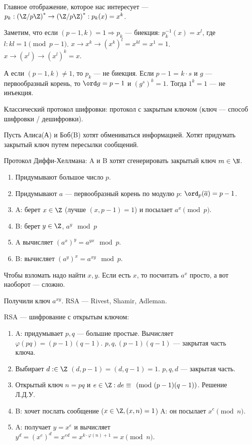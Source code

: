 Главное отображение, которое нас интересует --- $p_k: \left(\Z / p\Z\right)^* \to \left(\Z / p\Z\right)^*: p_k(x) = x^k$.

Заметим, что если  $(p - 1,k)=1 \Rightarrow p_k$ --- биекция:  $p_k^{-1}(x) = x^l$, где  $l: kl = 1 \pmod{p-1}$.  $x\to x^k\to(x^k)^l = x^{kl} = x^1 = 1$. $x\to (x^l) \to (x^l)^k = x$.

А если $(p - 1, k) \neq 1$, то $p_k$ --- не биекция. Если  $p - 1$ =  $k \cdot s$ и  $g$ --- первообразный корень, то  $\ord g = p - 1$ и $(g^s)^k = 1$. Тогда  $1^k=1$ --- не инъекция.

Классический протокол шифровки: протокол с закрытым ключом (ключ --- способ шифровки / дешифровки).

Пусть Алиса(А) и Боб(B) хотят обмениваться информацией. Хотят придумать закрытый ключ путем пересылки сообщений. 

Протокол Диффи-Хеллмана: A и B хотят сгенерировать закрытый ключ $m \in \N$.
 \begin{enumerate}
     \item Придумывают большое число $p$.
     \item Придумывают  $a$ --- первообразный корень по модулю  $p$:  $\ord_p(\overline{a}) = p - 1$.
     \item A: берет  $x \in \Z$ (лучше $(x, p - 1) = 1$) и посылает $a^x \pmod p$.
     \item B: берет $y \in \Z$,  $a^y \mod p$ 
     \item A вычисляет $\left(a^x\right)^y = a^{yx} \mod p$.
     \item B: вычисляет $(a^y)^x = a^{xy} \mod p$.
\end{enumerate}

Чтобы взломать надо найти $x, y$. Если есть  $x$, то посчитать  $a^x$ просто, а вот наоборот --- сложно.

Получили ключ  $a^{xy}$.
RSA --- Rivest, Shamir, Adleman.

RSA --- шифрование с открытым ключом:
\begin{enumerate}
    \item A: придумывает $p, q$ --- большие простые. Вычисляет  $\varphi(pq) = (p-1)(q-1)$.  $p, q, (p-1)(q-1)$ --- закрытая часть ключа. 
    \item Выбирает  $d: \in \Z$  $(d, p - 1) = (d, q - 1) = 1$.  $p, q, d$ --- закрытая часть.
    \item Открытый ключ $n = pq$ и  $e \in \Z: de \equiv \pmod{(p-1)(q-1)}$. Решение Л.Д.У.
    \item B: хочет послать сообщение ($x \in \Z, (x, n) = 1$) A: он посылает $x^e \pmod n$.
    \item  A: получает  $y=x^e$ и вычисляет  $y^d = (x^e)^d = x^{ed} = x^{k \cdot \varphi(n) + 1} = x \pmod{n}$.
\end{enumerate}

